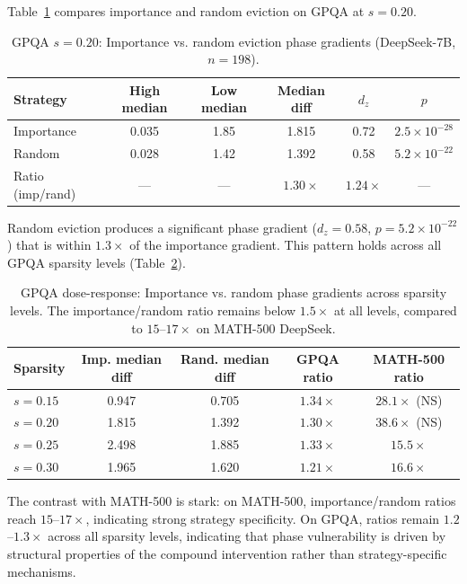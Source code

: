 \documentclass[11pt,a4paper]{article}
\begin{document}
Table~\ref{tab:gpqa_random_vs_imp} compares importance and random eviction on GPQA at $s=0.20$.

\begin{table}[h]
\centering
\caption{GPQA $s=0.20$: Importance vs. random eviction phase gradients (DeepSeek-7B, $n=198$).}
\label{tab:gpqa_random_vs_imp}
\small
\begin{tabular}{lccccc}
\toprule
Strategy & High median & Low median & Median diff & $d_z$ & $p$ \\
\midrule
Importance & 0.035 & 1.85 & 1.815 & 0.72 & $2.5 \times 10^{-28}$ \\
Random & 0.028 & 1.42 & 1.392 & 0.58 & $5.2 \times 10^{-22}$ \\
\midrule
Ratio (imp/rand) & --- & --- & $1.30\times$ & $1.24\times$ & --- \\
\bottomrule
\end{tabular}
\end{table}

Random eviction produces a significant phase gradient ($d_z = 0.58$, $p = 5.2 \times 10^{-22}$) that is within $1.3\times$ of the importance gradient. This pattern holds across all GPQA sparsity levels (Table~\ref{tab:gpqa_dose_imp_rand}).

\begin{table}[h]
\centering
\caption{GPQA dose-response: Importance vs. random phase gradients across sparsity levels. The importance/random ratio remains below $1.5\times$ at all levels, compared to $15$--$17\times$ on MATH-500 DeepSeek.}
\label{tab:gpqa_dose_imp_rand}
\small
\begin{tabular}{lcccc}
\toprule
Sparsity & Imp. median diff & Rand. median diff & GPQA ratio & MATH-500 ratio \\
\midrule
$s=0.15$ & 0.947 & 0.705 & $1.34\times$ & $28.1\times$ (NS) \\
$s=0.20$ & 1.815 & 1.392 & $1.30\times$ & $38.6\times$ (NS) \\
$s=0.25$ & 2.498 & 1.885 & $1.33\times$ & $15.5\times$ \\
$s=0.30$ & 1.965 & 1.620 & $1.21\times$ & $16.6\times$ \\
\bottomrule
\end{tabular}
\end{table}

The contrast with MATH-500 is stark: on MATH-500, importance/random ratios reach $15$--$17\times$, indicating strong strategy specificity. On GPQA, ratios remain $1.2$--$1.3\times$ across all sparsity levels, indicating that phase vulnerability is driven by structural properties of the compound intervention rather than strategy-specific mechanisms.
\end{document}
